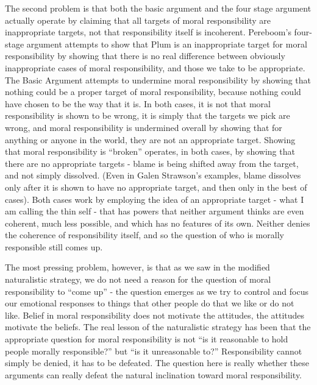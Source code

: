 \documentclass[phd,12pt,oneside,paper=letterpaper]{ubcthesis}
\begin{document}
The second problem is that both the basic argument and the four stage argument actually operate by claiming that all targets of moral responsibility are inappropriate targets, not that responsibility itself is incoherent. Pereboom's four-stage argument attempts to show that Plum is an inappropriate target for moral responsibility by showing that there is no real difference between obviously inappropriate cases of moral responsibility, and those we take to be appropriate. The Basic Argument attempts to undermine moral responsibility by showing that nothing could be a proper target of moral responsibility, because nothing could have chosen to be the way that it is. In both cases, it is not that moral responsibility is shown to be wrong, it is simply that the targets we pick are wrong, and moral responsibility is undermined overall by showing that for anything or anyone in the world, they are not an appropriate target. Showing that moral responsibility is ``broken'' operates, in both cases, by showing that there are no appropriate targets - blame is being shifted away from the target, and not simply dissolved. (Even in Galen Strawson's examples, blame dissolves only after it is shown to have no appropriate target, and then only in the best of cases). Both cases work by employing the idea of an appropriate target - what I am calling the thin self - that has powers that neither argument thinks are even coherent, much less possible, and which has no features of its own. Neither denies the coherence of responsibility itself, and so the question of who is morally responsible still comes up. 

The most pressing problem, however, is that as we saw in the modified naturalistic strategy, we do not need a reason for the question of moral responsibility to ``come up'' - the question emerges as we try to control and focus our emotional responses to things that other people do that we like or do not like. Belief in moral responsibility does not motivate the attitudes, the attitudes motivate the beliefs. The real lesson of the naturalistic strategy has been that the appropriate question for moral responsibility is not ``is it reasonable to hold people morally responsible?'' but ``is it unreasonable to?'' Responsibility cannot simply be denied, it has to be defeated. The question here is really whether these arguments can really defeat the natural inclination toward moral responsibility. 
\end{document}
